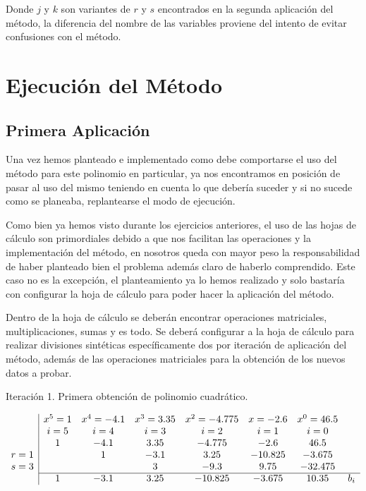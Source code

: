 \documentclass{article}
\begin{document}
Donde $j$ y $k$ son variantes de $r$ y $s$ encontrados en la segunda aplicación del
método, la diferencia del nombre de las variables proviene del intento de evitar
confusiones con el método.


\section{Ejecución del Método}
\subsection{Primera Aplicación}
Una vez hemos planteado e implementado como debe comportarse el uso del método para este
polinomio en particular, ya nos encontramos en posición de pasar al uso del mismo teniendo
en cuenta lo que debería suceder y si no sucede como se planeaba, replantearse el modo
de ejecución.


Como bien ya hemos visto durante los ejercicios anteriores, el uso de las hojas de cálculo
son primordiales debido a que nos facilitan las operaciones y la implementación del método,
en nosotros queda con mayor peso la responsabilidad de haber planteado bien el problema
además claro de haberlo comprendido. Este caso no es la excepción, el planteamiento ya
lo hemos realizado y solo bastaría con configurar la hoja de cálculo para poder hacer
la aplicación del método.


Dentro de la hoja de cálculo se deberán encontrar operaciones matriciales, multiplicaciones,
sumas y es todo. Se deberá configurar a la hoja de cálculo para realizar divisiones sintéticas
específicamente dos por iteración de aplicación del método, además de las operaciones
matriciales para la obtención de los nuevos datos a probar.


Iteración 1. Primera obtención de polinomio cuadrático.


\begin{equation*}
   \begin{array}{c|ccccccc}
       & x^5 = 1 & x^4 = -4.1 &x^3 = 3.35 & x^2 = -4.775 & x = - 2.6 &x^0 = 46.5& \\
      &i = 5 & i = 4 & i = 3 & i = 2 & i = 1 & i = 0 & \\
       & 1 & -4.1 & 3.35 & -4.775& -2.6& 46.5 & \\
     r = 1 & & 1 &-3.1&3.25&-10.825&-3.675& \\
     s = 3 & & & 3 & -9.3 & 9.75 & -32.475 & \\
     \cline{2-8}
        & 1 & -3.1 & 3.25 & -10.825 & -3.675 & 10.35& b_i \\
   \end{array}
\end{equation*}
\end{document}
